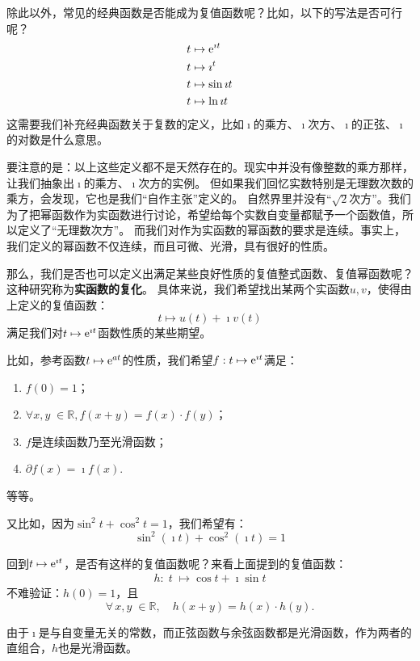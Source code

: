 \documentclass[12pt,UTF8,fontset=none]{ctexbook}
\begin{document}
除此以外，常见的经典函数是否能成为复值函数呢？比如，以下的写法是否可行呢？
\begin{align*}
    t &\mapsto \mathrm{e}^{\imath t} \\
    t &\mapsto \imath^t \\
    t &\mapsto \sin{\imath t} \\
    t &\mapsto \ln{\imath t} 
\end{align*}
这需要我们补充经典函数关于复数的定义，比如$\imath$的乘方、$\imath$次方、$\imath$的正弦、$\imath$的对数是什么意思。

要注意的是：以上这些定义都不是天然存在的。现实中并没有像整数的乘方那样，让我们抽象出$\imath$的乘方、$\imath$次方的实例。
但如果我们回忆实数特别是无理数次数的乘方，会发现，它也是我们“自作主张”定义的。
自然界里并没有“$\sqrt{2}$次方”。我们为了把幂函数作为实函数进行讨论，希望给每个实数自变量都赋予一个函数值，所以定义了“无理数次方”。
而我们对作为实函数的幂函数的要求是连续。事实上，我们定义的幂函数不仅连续，而且可微、光滑，具有很好的性质。

那么，我们是否也可以定义出满足某些良好性质的复值整式函数、复值幂函数呢？这种研究称为\textbf{实函数的复化}。
具体来说，我们希望找出某两个实函数$u,v$，使得由上定义的复值函数：
$$ t\mapsto u(t) + \imath v(t)$$
满足我们对$t\mapsto \mathrm{e}^{\imath t}$函数性质的某些期望。

比如，参考函数$t\mapsto \mathrm{e}^{at}$的性质，我们希望$f: t\mapsto \mathrm{e}^{\imath t}$满足：
\begin{enumerate}
    \item $f(0) = 1$；
    \item $\forall x, y \; \in \mathbb{R}, f(x + y) = f(x)\cdot f(y)$；
    \item $f$是连续函数乃至光滑函数；
    \item $\partial f(x) = \imath f(x).$
\end{enumerate}
等等。

又比如，因为$\sin^2{t} + \cos^2{t} = 1$，我们希望有：
$$ \sin^2{(\imath t)} + \cos^2{(\imath t)} = 1 $$

回到$t\mapsto \mathrm{e}^{\imath t}$，是否有这样的复值函数呢？来看上面提到的复值函数：
\begin{align*}
    h: \;t \;\mapsto \cos{t} + \imath \sin{t}
\end{align*}
不难验证：$h(0) = 1$，且
$$ \forall \, x, y\; \in \mathbb{R}, \quad h(x + y) = h(x)\cdot h(y).$$

由于$\imath$是与自变量无关的常数，而正弦函数与余弦函数都是光滑函数，作为两者的直组合，$h$也是光滑函数。
\end{document}
